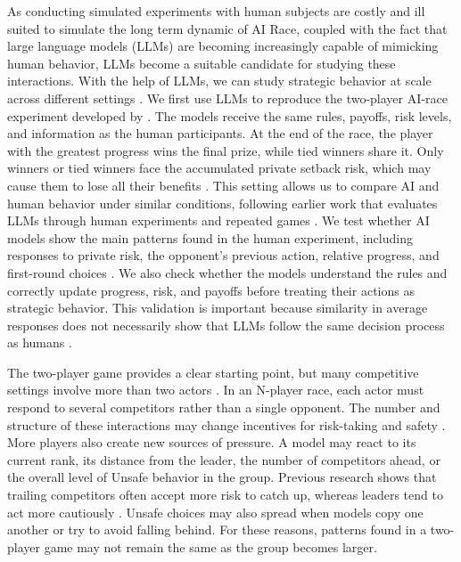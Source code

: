 \documentclass[sigconf,anonymous]{aamas}
\begin{document}
As conducting simulated experiments with human subjects are costly and ill suited to simulate the long term dynamic of AI Race, coupled with the fact that large language models (LLMs) are becoming increasingly capable of mimicking human behavior, LLMs become a suitable candidate for studying these interactions. With the help of LLMs, we can study strategic behavior at scale across different settings \citep{using_llm_to_simulate,out_of_one}. We first use LLMs to reproduce the two-player AI-race experiment developed by \citet{falling_behind_unsafe}. The models receive the same rules, payoffs, risk levels, and information as the human participants. At the end of the race, the player with the greatest progress wins the final prize, while tied winners share it. Only winners or tied winners face the accumulated private setback risk, which may cause them to lose all their benefits \citep{to_regulate_or_not,falling_behind_unsafe}. This setting allows us to compare AI and human behavior under similar conditions, following earlier work that evaluates LLMs through human experiments and repeated games \citep{using_llm_to_simulate,playing_repeated_games_with_llms}. We test whether AI models show the main patterns found in the human experiment, including responses to private risk, the opponent’s previous action, relative progress, and first-round choices \citep{falling_behind_unsafe}. We also check whether the models understand the rules and correctly update progress, risk, and payoffs before treating their actions as strategic behavior. This validation is important because similarity in average responses does not necessarily show that LLMs follow the same decision process as humans \citep{synthetic_replacement_human}.

The two-player game provides a clear starting point, but many competitive settings involve more than two actors \citep{racing_to_the_precipice,role_of_Cooperation}. In an N-player race, each actor must respond to several competitors rather than a single opponent. The number and structure of these interactions may change incentives for risk-taking and safety \citep{artificial_intelligence_development_races,competition_and_risk-taking}. More players also create new sources of pressure. A model may react to its current rank, its distance from the leader, the number of competitors ahead, or the overall level of Unsafe behavior in the group. Previous research shows that trailing competitors often accept more risk to catch up, whereas leaders tend to act more cautiously \citep{risk-taking_touraments,risk_taking_in_competition}. Unsafe choices may also spread when models copy one another or try to avoid falling behind. For these reasons, patterns found in a two-player game may not remain the same as the group becomes larger.
\end{document}
